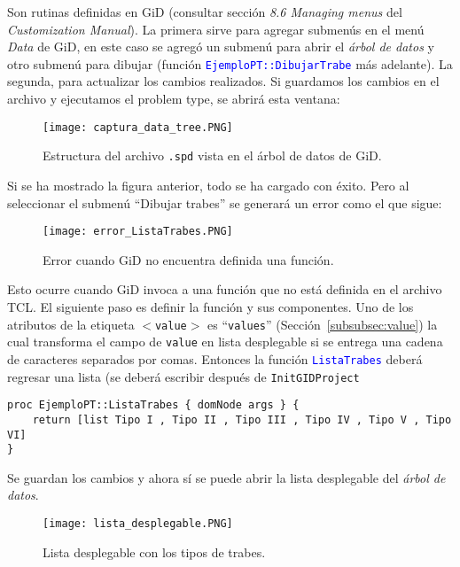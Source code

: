 \documentclass[10pt, a4paper, twocolumn]{article}
\begin{document}
Son rutinas definidas en GiD (consultar sección \textit{8.6 Managing menus} del \textit{Customization Manual}). La primera sirve para agregar submenús en el menú \textit{Data} de GiD, en este caso se agregó un submenú para abrir el \textit{árbol de datos} y otro submenú para dibujar (función \textcolor{blue}{\texttt{EjemploPT::DibujarTrabe}} más adelante). La segunda, para actualizar los cambios realizados. Si guardamos los cambios en el archivo y ejecutamos el problem type, se abrirá esta ventana:

\begin{figure}[hbtp!]\centering
	\texttt{[image: captura\_data\_tree.PNG]}
	\caption{Estructura del archivo \texttt{.spd} vista en el árbol de datos de GiD.\label{fig:captura_data_tree}}
\end{figure}

Si se ha mostrado la figura anterior, todo se ha cargado con éxito. Pero al seleccionar el submenú ``Dibujar trabes'' se generará un error como el que sigue:

\begin{figure}[hbt!]\centering
	\texttt{[image: error\_ListaTrabes.PNG]}
	\caption{Error cuando GiD no encuentra definida una función.\label{fig:error_ListaTrabes}}
\end{figure}

Esto ocurre cuando GiD invoca a una función que no está definida en el archivo TCL. El siguiente paso es definir la función y sus componentes. Uno de los atributos de la etiqueta \texttt{$<$value$>$} es ``\texttt{values}'' (Sección~\ref{subsubsec:value}) la cual transforma el campo de \texttt{value} en lista desplegable si se entrega una cadena de caracteres separados por comas. Entonces la función \textcolor{blue}{\texttt{ListaTrabes}} deberá regresar una lista (se deberá escribir después de \texttt{InitGIDProject}

\lstset{language=tcl} 
\begin{lstlisting}
proc EjemploPT::ListaTrabes { domNode args } {
	return [list Tipo I , Tipo II , Tipo III , Tipo IV , Tipo V , Tipo VI]
}
\end{lstlisting}

Se guardan los cambios y ahora sí se puede abrir la lista desplegable del \textit{árbol de datos}.

\begin{figure}[hbt!]\centering
	\texttt{[image: lista\_desplegable.PNG]}
	\caption{Lista desplegable con los tipos de trabes.\label{fig:lista_desplegable}}
\end{figure}
\end{document}

